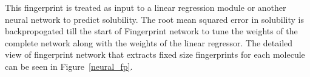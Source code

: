 \documentclass[11pt,a4paper]{report}
\begin{document}
%
%
%
%
%
%

This fingerprint is treated as input to a linear regression module or another neural network to predict solubility. The root mean squared error in solubility is backpropogated till the start of Fingerprint network to tune the weights of the complete network along with the weights of the linear regressor. The detailed view of fingerprint network that extracts fixed size fingerprints for each molecule can be seen in Figure~\ref{neural_fp}.
\end{document}
